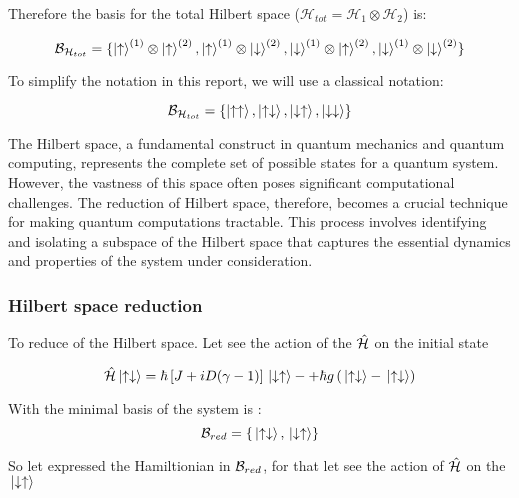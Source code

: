 Therefore the basis for the total Hilbert space ($\mathcal{H}_{tot} = \mathcal{H}_{1} \otimes \mathcal{H}_{2}$) is:

\[ \mathcal{B}_{\mathcal{H}_{tot}} = \{ \ket{\uparrow}^{(1)} \otimes \ket{\uparrow}^{(2)}, \ket{\uparrow}^{(1)} \otimes \ket{\downarrow}^{(2)}, \ket{\downarrow}^{(1)} \otimes \ket{\uparrow}^{(2)},  \ket{\downarrow}^{(1)} \otimes \ket{\downarrow}^{(2)} \} \]

To simplify the notation in this report, we will use a classical notation:

\begin{equation}\label{eq: basis H tot}
	\mathcal{B}_{\mathcal{H}_{tot}} = \{ \ket{\uparrow \uparrow}, \ket{\uparrow \downarrow}, \ket{\downarrow \uparrow}, \ket{\downarrow \downarrow} \} 
\end{equation}

The Hilbert space, 
a fundamental construct 
in quantum mechanics and quantum 
computing, represents the complete set of possible states 
for a quantum system. However, the vastness of this space 
often poses significant computational challenges. 
The reduction of Hilbert space, therefore, becomes 
a crucial technique for making quantum computations 
tractable. This process involves identifying and 
isolating a subspace of the Hilbert space that 
captures the essential dynamics and properties 
of the system under consideration.



\subsubsection{Hilbert space reduction}
To reduce of the Hilbert space. Let see the action of the 
$\hat{\mathcal{H}}$ on the initial state

\begin{equation}\label{eq: action hamil on initial state}
    \hat{\mathcal{H}} \ket*{\uparrow \downarrow} = \hbar \left[J + i D(\gamma - 1)\right] \ket*{\downarrow \uparrow} -
    + \hbar g  \left(\ket*{\uparrow \downarrow} - \ket*{\uparrow \downarrow} \right) 
\end{equation}



With  the minimal 
basis of the system is :
\begin{equation}
    \mathcal{B}_{red} = \{ \ket*{\uparrow \downarrow} , 
    \ket*{\downarrow \uparrow}  \}
\end{equation}

So let expressed the Hamiltionian in $\mathcal{B}_{red}$, for that 
let see the action of $ \hat{\mathcal{H}} $ on the $\ket*{\downarrow \uparrow}$

